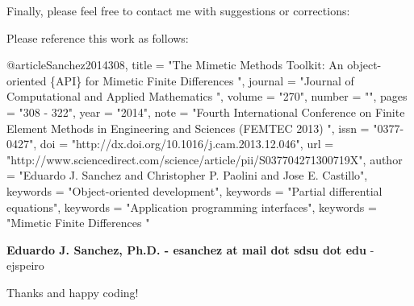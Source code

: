 \begin{DoxyPre}Finally, please feel free to contact me with suggestions or corrections:\end{DoxyPre}



\begin{DoxyPre}Please reference this work as follows:
\begin{DoxyVerb}@article{Sanchez2014308,
  title = "The Mimetic Methods Toolkit: An object-oriented \{API\} for Mimetic
Finite Differences ",
  journal = "Journal of Computational and Applied Mathematics ",
  volume = "270",
  number = "",
  pages = "308 - 322",
  year = "2014",
  note = "Fourth International Conference on Finite Element Methods in
Engineering and Sciences (FEMTEC 2013) ",
  issn = "0377-0427",
  doi = "http://dx.doi.org/10.1016/j.cam.2013.12.046",
  url = "http://www.sciencedirect.com/science/article/pii/S037704271300719X",
  author = "Eduardo J. Sanchez and Christopher P. Paolini and Jose E. Castillo",
  keywords = "Object-oriented development",
  keywords = "Partial differential equations",
  keywords = "Application programming interfaces",
  keywords = "Mimetic Finite Differences "
}
\end{DoxyVerb}
\end{DoxyPre}



\begin{DoxyPre}{\bfseries Eduardo J. Sanchez, Ph.D. - esanchez at mail dot sdsu dot edu} - ejspeiro\end{DoxyPre}



\begin{DoxyPre}Thanks and happy coding!
\end{DoxyPre}
 